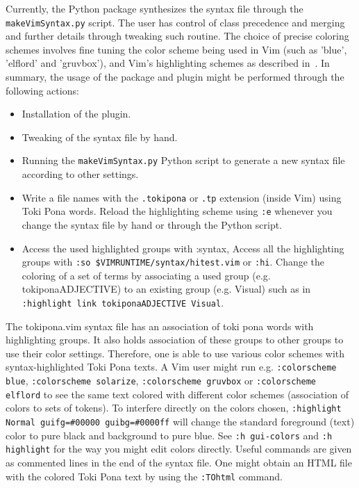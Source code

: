 \documentclass{article}
\newcommand{\tttt}[1]{\texttt{#1}}
\begin{document}
Currently, the Python package synthesizes the
syntax file through the\\ \tttt{makeVimSyntax.py} script.
The user has control of class precedence and
merging and further details through tweaking such routine.
The choice of precise coloring schemes
involves fine tuning the color scheme being
used in Vim (such as 'blue', 'elflord' and 'gruvbox'),
and Vim's highlighting schemes as described in~\cite{vimArt}.
In summary,
the usage of the package and plugin might be performed
through the following actions:
\begin{itemize}
  \item Installation of the plugin.
  \item Tweaking of the syntax file by hand.
  \item Running the \tttt{makeVimSyntax.py}
    Python script to generate a new syntax file
    according to other settings.
  \item Write a file names with the \tttt{.tokipona} or \tttt{.tp} extension
    (inside Vim) using Toki Pona words.
    Reload the highlighting scheme using \tttt{:e} whenever you
    change the syntax file by hand or through the Python script.
  \item Access the used highlighted groups with :syntax,
    Access all the highlighting groups with \tttt{:so
    \$VIMRUNTIME/syntax/hitest.vim} or \tttt{:hi}.
    Change the coloring of a set of terms by associating
    a used group (e.g. tokiponaADJECTIVE) to an existing group (e.g.
    Visual) such as in \tttt{:highlight link tokiponaADJECTIVE Visual}.
\end{itemize}

The tokipona.vim syntax file has an association of toki pona
words with highlighting groups.
It also holds association of these groups to other groups
to use their color settings.
Therefore, one is able to use various color schemes
with syntax-highlighted Toki Pona texts.
A Vim user might run e.g. \tttt{:colorscheme blue},
\tttt{:colorscheme solarize}, \tttt{:colorscheme gruvbox} or
\tttt{:colorscheme elflord} to see the same text colored
with different color schemes (association of colors to sets of tokens).
To interfere directly on the colors chosen,
\tttt{:highlight Normal guifg=\#00000 guibg=\#0000ff}
will change the standard foreground (text) color to pure black
and background to pure blue.
See \tttt{:h gui-colors} and \tttt{:h highlight}
for the way you might edit colors directly.
Useful commands are given as commented lines
in the end of the syntax file.
One might obtain an HTML file with the colored Toki Pona text
by using the \tttt{:TOhtml} command.
\end{document}
